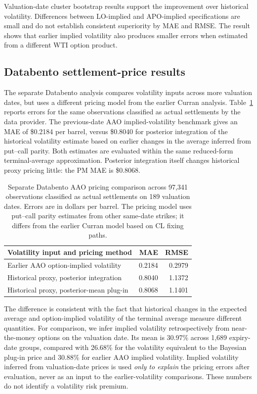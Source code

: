 Valuation-date cluster bootstrap results support the improvement over historical volatility. Differences between LO-implied and APO-implied specifications are small and do not establish consistent superiority by MAE and RMSE. The result shows that earlier implied volatility also produces smaller errors when estimated from a different WTI option product.


\subsection{Databento settlement-price results}

The separate Databento analysis compares volatility inputs across
more valuation dates, but uses a different pricing model from
the earlier Curran analysis. Table~\ref{tab:remef_databento}
reports errors for the same observations classified
as actual settlements by the data provider. The previous-date
AAO implied-volatility benchmark gives an MAE of \$0.2184 per
barrel, versus \$0.8040 for posterior integration of the
historical volatility estimate based on earlier changes in
the average inferred from put--call parity. Both estimates
are evaluated within the same reduced-form terminal-average
approximation. Posterior integration itself changes historical
proxy pricing little: the PM MAE is \$0.8068.

\begin{table}[t]
\centering
\caption{Separate Databento AAO pricing comparison across 97,341 observations classified as actual settlements on 189 valuation dates. Errors are in dollars per barrel. The pricing model uses put--call parity estimates from other same-date strikes; it differs from the earlier Curran model based on CL fixing paths.}
\label{tab:remef_databento}
\begin{tabular}{lrr}
\toprule
Volatility input and pricing method & MAE & RMSE\\
\midrule
Earlier AAO option-implied volatility & 0.2184 & 0.2979\\
Historical proxy, posterior integration & 0.8040 & 1.1372\\
Historical proxy, posterior-mean plug-in & 0.8068 & 1.1401\\
\bottomrule
\end{tabular}
\end{table}

The difference is consistent with the fact that historical
changes in the expected average and option-implied volatility
of the terminal average measure different quantities.
For comparison, we infer implied volatility retrospectively from
near-the-money options on the valuation date. Its mean is 30.97\%
across 1,689 expiry-date groups, compared with 26.68\% for the
volatility equivalent to the Bayesian plug-in price and 30.88\%
for earlier AAO implied volatility.
Implied volatility inferred from valuation-date prices is used
\emph{only to explain} the pricing errors after evaluation, never
as an input to the earlier-volatility comparisons. These
numbers do not identify a volatility risk premium.

